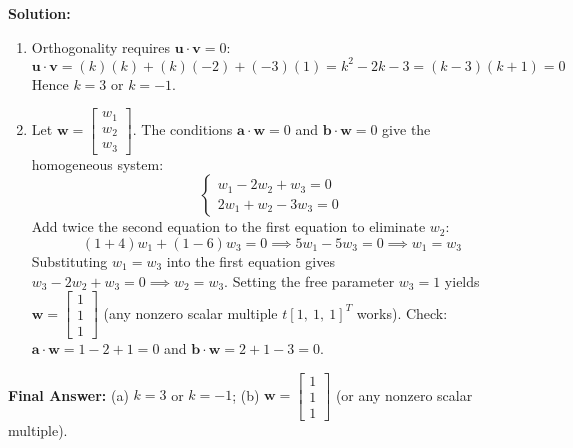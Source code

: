 \documentclass[11pt, letterpaper]{article}
\theoremstyle{definition}
\theoremstyle{remark}
\begin{document}
\textbf{Solution:}
\begin{enumerate}[label=(\alph*)]
    \item Orthogonality requires $\mathbf{u} \cdot \mathbf{v} = 0$:
    \[
    \mathbf{u} \cdot \mathbf{v} = (k)(k) + (k)(-2) + (-3)(1) = k^2 - 2k - 3 = (k - 3)(k + 1) = 0
    \]
    Hence $k = 3$ or $k = -1$.
    \item Let $\mathbf{w} = \begin{bmatrix} w_1 \\ w_2 \\ w_3 \end{bmatrix}$. The conditions $\mathbf{a} \cdot \mathbf{w} = 0$ and $\mathbf{b} \cdot \mathbf{w} = 0$ give the homogeneous system:
    \[
    \begin{cases}
    w_1 - 2w_2 + w_3 = 0 \\
    2w_1 + w_2 - 3w_3 = 0
    \end{cases}
    \]
    Add twice the second equation to the first equation to eliminate $w_2$:
    \[
    (1 + 4)w_1 + (1 - 6)w_3 = 0 \implies 5w_1 - 5w_3 = 0 \implies w_1 = w_3
    \]
    Substituting $w_1 = w_3$ into the first equation gives $w_3 - 2w_2 + w_3 = 0 \implies w_2 = w_3$. Setting the free parameter $w_3 = 1$ yields $\mathbf{w} = \begin{bmatrix} 1 \\ 1 \\ 1 \end{bmatrix}$ (any nonzero scalar multiple $t[1,\ 1,\ 1]^T$ works).
    Check: $\mathbf{a} \cdot \mathbf{w} = 1 - 2 + 1 = 0$ and $\mathbf{b} \cdot \mathbf{w} = 2 + 1 - 3 = 0$.
\end{enumerate}
\textbf{Final Answer:} (a) $k = 3$ or $k = -1$; (b) $\mathbf{w} = \begin{bmatrix} 1 \\ 1 \\ 1 \end{bmatrix}$ (or any nonzero scalar multiple).
\end{document}
